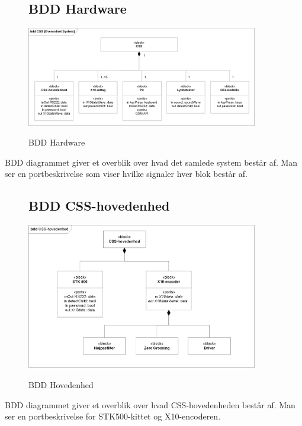 \begin{figure}[H] \centering
\subsection{BDD Hardware}
{\includegraphics[width=0.9\textwidth]{billeder/diagrammer/BDD_Hardware}}
\caption{BDD Hardware}
\label{lab:bddhardware}
\raggedright
\end{figure}
BDD diagrammet giver et overblik over hvad det samlede system består af. Man ser en portbeskrivelse som viser hvilke signaler hver blok består af.

\begin{figure}[H] \centering
\subsection{BDD CSS-hovedenhed}
{\includegraphics[width=0.9\textwidth]{billeder/diagrammer/BDD_Hovedenhed}}
\caption{BDD Hovedenhed}
\label{lab:bddhovedenhed}
\raggedright
\end{figure}
BDD diagrammet giver et overblik over hvad CSS-hovedenheden består af. Man ser en portbeskrivelse for STK500-kittet og X10-encoderen. 

